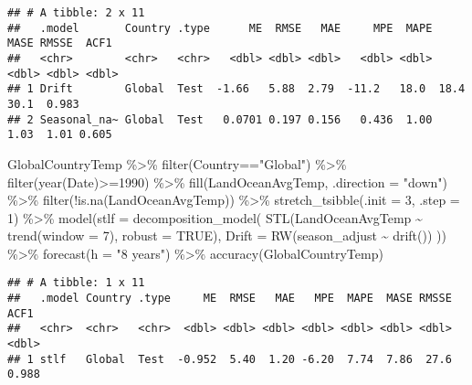 \documentclass[
]{article}
\newenvironment{Shaded}{\begin{snugshade}}{\end{snugshade}}
\newcommand{\AttributeTok}[1]{\textcolor[rgb]{0.77,0.63,0.00}{#1}}
\newcommand{\ConstantTok}[1]{\textcolor[rgb]{0.00,0.00,0.00}{#1}}
\newcommand{\DecValTok}[1]{\textcolor[rgb]{0.00,0.00,0.81}{#1}}
\newcommand{\FunctionTok}[1]{\textcolor[rgb]{0.00,0.00,0.00}{#1}}
\newcommand{\NormalTok}[1]{#1}
\newcommand{\SpecialCharTok}[1]{\textcolor[rgb]{0.00,0.00,0.00}{#1}}
\newcommand{\StringTok}[1]{\textcolor[rgb]{0.31,0.60,0.02}{#1}}
\begin{document}
\begin{verbatim}
## # A tibble: 2 x 11
##   .model       Country .type      ME  RMSE   MAE     MPE  MAPE  MASE RMSSE  ACF1
##   <chr>        <chr>   <chr>   <dbl> <dbl> <dbl>   <dbl> <dbl> <dbl> <dbl> <dbl>
## 1 Drift        Global  Test  -1.66   5.88  2.79  -11.2   18.0  18.4  30.1  0.983
## 2 Seasonal_na~ Global  Test   0.0701 0.197 0.156   0.436  1.00  1.03  1.01 0.605
\end{verbatim}

\begin{Shaded}
\begin{Highlighting}[]
\NormalTok{GlobalCountryTemp }\SpecialCharTok{\%\textgreater{}\%} 
  \FunctionTok{filter}\NormalTok{(Country}\SpecialCharTok{==}\StringTok{"Global"}\NormalTok{) }\SpecialCharTok{\%\textgreater{}\%} 
  \FunctionTok{filter}\NormalTok{(}\FunctionTok{year}\NormalTok{(Date)}\SpecialCharTok{\textgreater{}=}\DecValTok{1990}\NormalTok{) }\SpecialCharTok{\%\textgreater{}\%}
  \FunctionTok{fill}\NormalTok{(LandOceanAvgTemp, }\AttributeTok{.direction =} \StringTok{"down"}\NormalTok{) }\SpecialCharTok{\%\textgreater{}\%}
  \FunctionTok{filter}\NormalTok{(}\SpecialCharTok{!}\FunctionTok{is.na}\NormalTok{(LandOceanAvgTemp)) }\SpecialCharTok{\%\textgreater{}\%}
  \FunctionTok{stretch\_tsibble}\NormalTok{(}\AttributeTok{.init =} \DecValTok{3}\NormalTok{, }\AttributeTok{.step =} \DecValTok{1}\NormalTok{) }\SpecialCharTok{\%\textgreater{}\%}
  \FunctionTok{model}\NormalTok{(}\AttributeTok{stlf =} \FunctionTok{decomposition\_model}\NormalTok{(}
    \FunctionTok{STL}\NormalTok{(LandOceanAvgTemp }\SpecialCharTok{\textasciitilde{}} \FunctionTok{trend}\NormalTok{(}\AttributeTok{window =} \DecValTok{7}\NormalTok{), }\AttributeTok{robust =} \ConstantTok{TRUE}\NormalTok{),}
        \AttributeTok{Drift =} \FunctionTok{RW}\NormalTok{(season\_adjust }\SpecialCharTok{\textasciitilde{}} \FunctionTok{drift}\NormalTok{())}
\NormalTok{    )) }\SpecialCharTok{\%\textgreater{}\%} \FunctionTok{forecast}\NormalTok{(}\AttributeTok{h =} \StringTok{"8 years"}\NormalTok{) }\SpecialCharTok{\%\textgreater{}\%} 
  \FunctionTok{accuracy}\NormalTok{(GlobalCountryTemp)}
\end{Highlighting}
\end{Shaded}

\begin{verbatim}
## # A tibble: 1 x 11
##   .model Country .type     ME  RMSE   MAE   MPE  MAPE  MASE RMSSE  ACF1
##   <chr>  <chr>   <chr>  <dbl> <dbl> <dbl> <dbl> <dbl> <dbl> <dbl> <dbl>
## 1 stlf   Global  Test  -0.952  5.40  1.20 -6.20  7.74  7.86  27.6 0.988
\end{verbatim}
\end{document}
